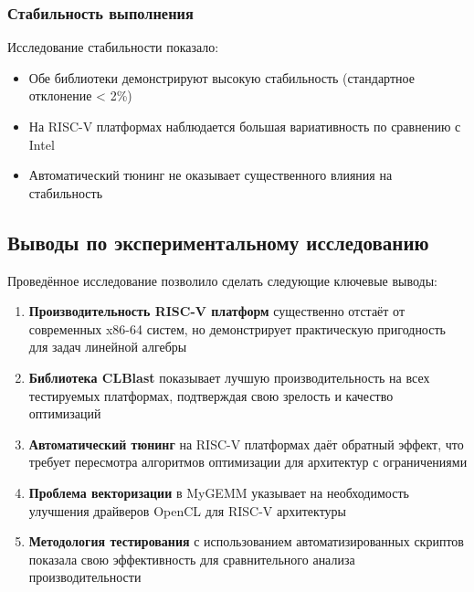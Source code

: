 \subsubsection{Стабильность выполнения}

Исследование стабильности показало:

\begin{itemize}
    \item Обе библиотеки демонстрируют высокую стабильность (стандартное отклонение < 2\%)
    \item На RISC-V платформах наблюдается большая вариативность по сравнению с Intel
    \item Автоматический тюнинг не оказывает существенного влияния на стабильность
\end{itemize}

\subsection{Выводы по экспериментальному исследованию}

Проведённое исследование позволило сделать следующие ключевые выводы:

\begin{enumerate}
    \item \textbf{Производительность RISC-V платформ} существенно отстаёт от современных x86-64 систем, но демонстрирует практическую пригодность для задач линейной алгебры
    
    \item \textbf{Библиотека CLBlast} показывает лучшую производительность на всех тестируемых платформах, подтверждая свою зрелость и качество оптимизаций
    
    \item \textbf{Автоматический тюнинг} на RISC-V платформах даёт обратный эффект, что требует пересмотра алгоритмов оптимизации для архитектур с ограничениями
    
    \item \textbf{Проблема векторизации} в MyGEMM указывает на необходимость улучшения драйверов OpenCL для RISC-V архитектуры
    
    \item \textbf{Методология тестирования} с использованием автоматизированных скриптов показала свою эффективность для сравнительного анализа производительности
\end{enumerate}